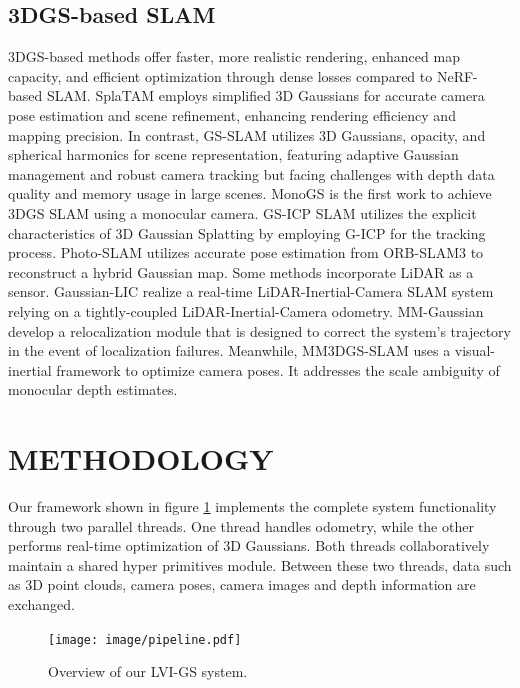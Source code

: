 \documentclass[lettersize,journal]{IEEEtran}
\begin{document}
\subsection{3DGS-based SLAM}
3DGS-based methods offer faster, more realistic rendering, enhanced map capacity, and efficient optimization through dense losses compared to NeRF-based SLAM. SplaTAM\cite{splatam} employs simplified 3D Gaussians for accurate camera pose estimation and scene refinement, enhancing rendering efficiency and mapping precision. In contrast, GS-SLAM\cite{gsslam} utilizes 3D Gaussians, opacity, and spherical harmonics for scene representation, featuring adaptive Gaussian management and robust camera tracking but facing challenges with depth data quality and memory usage in large scenes. MonoGS\cite{monogs} is the first work to achieve 3DGS SLAM using a monocular camera. GS-ICP\cite{gsicp} SLAM utilizes the explicit characteristics of 3D Gaussian Splatting by employing G-ICP\cite{gicp} for the tracking process. Photo-SLAM\cite{photoslam} utilizes accurate pose estimation from ORB-SLAM3\cite{orbslam3} to reconstruct a hybrid Gaussian map. Some methods incorporate LiDAR as a sensor. Gaussian-LIC\cite{gaussianlic} realize a real-time LiDAR-Inertial-Camera SLAM system relying on a tightly-coupled LiDAR-Inertial-Camera odometry. MM-Gaussian\cite{mmgaussian} develop a relocalization module that is designed to correct the system’s trajectory in the event of localization failures. Meanwhile, MM3DGS-SLAM\cite{mm3dgs} uses a visual-inertial framework to optimize camera poses. It addresses the scale ambiguity of monocular depth estimates.

\section{METHODOLOGY}
Our framework shown in figure \ref{pipeline} implements the complete system functionality through two parallel threads. One thread handles odometry, while the other performs real-time optimization of 3D Gaussians. Both threads collaboratively maintain a shared hyper primitives module. Between these two threads, data such as 3D point clouds, camera poses, camera images and depth information are exchanged.

\begin{figure}[htb]  %
        \captionsetup{justification=justified, labelsep=colon}%
        \centering
        \texttt{[image: image/pipeline.pdf]}
        \caption{Overview of our LVI-GS system.
        }  %
        \label{pipeline}
\end{figure}%
\end{document}
